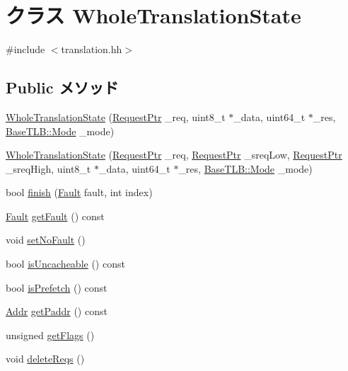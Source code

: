 \hypertarget{classWholeTranslationState}{
\section{クラス WholeTranslationState}
\label{classWholeTranslationState}
}


{\ttfamily \#include $<$translation.hh$>$}\subsection*{Public メソッド}
\begin{DoxyCompactItemize}
\item 
\hyperlink{classWholeTranslationState_aa9330770cac55c20fba11842fb48ceb9}{WholeTranslationState} (\hyperlink{classRequest}{RequestPtr} \_\-req, uint8\_\-t $\ast$\_\-data, uint64\_\-t $\ast$\_\-res, \hyperlink{classBaseTLB_a46c8a310cf4c094f8c80e1cb8dc1f911}{BaseTLB::Mode} \_\-mode)
\item 
\hyperlink{classWholeTranslationState_a6e6163dd6e49b443f56c30800ac95b75}{WholeTranslationState} (\hyperlink{classRequest}{RequestPtr} \_\-req, \hyperlink{classRequest}{RequestPtr} \_\-sreqLow, \hyperlink{classRequest}{RequestPtr} \_\-sreqHigh, uint8\_\-t $\ast$\_\-data, uint64\_\-t $\ast$\_\-res, \hyperlink{classBaseTLB_a46c8a310cf4c094f8c80e1cb8dc1f911}{BaseTLB::Mode} \_\-mode)
\item 
bool \hyperlink{classWholeTranslationState_a4d0ff87d4723870a1348d1f62d15d785}{finish} (\hyperlink{classRefCountingPtr}{Fault} fault, int index)
\item 
\hyperlink{classRefCountingPtr}{Fault} \hyperlink{classWholeTranslationState_a1ac977937b0a3cf64e58ba7141e4cc11}{getFault} () const 
\item 
void \hyperlink{classWholeTranslationState_a29ac402ee48ba100554ef01f2c8790c9}{setNoFault} ()
\item 
bool \hyperlink{classWholeTranslationState_a70c74b2809417ea8701dd6ba9e34312d}{isUncacheable} () const 
\item 
bool \hyperlink{classWholeTranslationState_a1eef1bb814a1f77346aba1648fb6d1c9}{isPrefetch} () const 
\item 
\hyperlink{base_2types_8hh_af1bb03d6a4ee096394a6749f0a169232}{Addr} \hyperlink{classWholeTranslationState_ad988a42a876d1cbc56556e1317e0f107}{getPaddr} () const 
\item 
unsigned \hyperlink{classWholeTranslationState_a009220068577b6979aeae8fe951bd63d}{getFlags} ()
\item 
void \hyperlink{classWholeTranslationState_a6dc2cbc61a85f942f081c1a136dd3585}{deleteReqs} ()
\end{DoxyCompactItemize}
